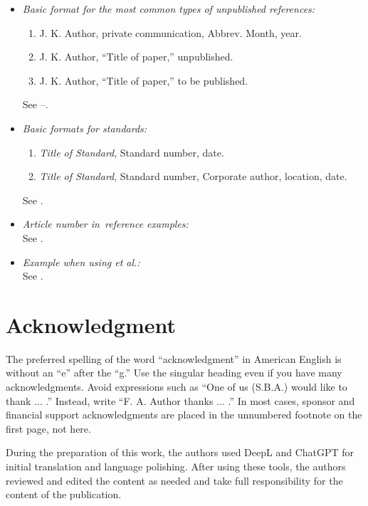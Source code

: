 \documentclass{ieeeaccess}
\begin{document}
\begin{itemize}
\item \emph{Basic format for the most common types of unpublished references:}
\begin{enumerate}
\item J. K. Author, private communication, Abbrev. Month, year.
\item J. K. Author, ``Title of paper,'' unpublished.
\item J. K. Author, ``Title of paper,'' to be published.
\end{enumerate}
See \cite{b27}--\cite{b29}.

\item \emph{Basic formats for standards:}
\begin{enumerate}
\item \emph{Title of Standard}, Standard number, date.
\item \emph{Title of Standard}, Standard number, Corporate author, location, date.
\end{enumerate}
See \cite{b30,b31}.

\item \emph{Article number in~reference examples:}\\
See \cite{b32,b33}.

\item \emph{Example when using et al.:}\\
See \cite{b34}.

\end{itemize}

\section*{Acknowledgment}
The preferred spelling of the word ``acknowledgment'' in American English is
without an ``e'' after the ``g.'' Use the singular heading even if you have
many acknowledgments. Avoid expressions such as ``One of us (S.B.A.) would
like to thank $\ldots$ .'' Instead, write ``F. A. Author thanks $\ldots$ .'' In most
cases, sponsor and financial support acknowledgments are placed in the
unnumbered footnote on the first page, not here.

During the preparation of this work, the authors used DeepL and ChatGPT for initial translation and language polishing. After using these tools, the authors reviewed and edited the content as needed and take full responsibility for the content of the publication.
\end{document}
